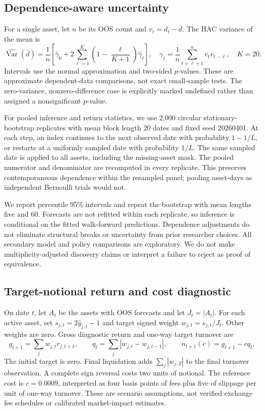 \documentclass[preprint,12pt,authoryear]{elsarticle}
\begin{document}
\subsection{Dependence-aware uncertainty}
For a single asset, let $n$ be its OOS count and $v_t=d_t-\bar d$. The HAC variance of the mean is
\begin{equation}
 \widehat{\operatorname{Var}}(\bar d)=\frac1n\left[
 \widehat\gamma_0+2\sum_{\ell=1}^{K}\left(1-\frac{\ell}{K+1}\right)\widehat\gamma_\ell\right],
 \quad \widehat\gamma_\ell=\frac1n\sum_{t=\ell+1}^{n}v_tv_{t-\ell},\quad K=20.
\end{equation}
Intervals use the normal approximation and two-sided $p$-values. These are approximate dependent-data comparisons, not exact small-sample tests. The zero-variance, nonzero-difference case is explicitly marked undefined rather than assigned a nonsignificant $p$-value.

For pooled inference and return statistics, we use 2,000 circular stationary-bootstrap replicates with mean block length 20 dates and fixed seed 20260401. At each step, an index continues to the next observed date with probability $1-1/L$, or restarts at a uniformly sampled date with probability $1/L$. The same sampled date is applied to all assets, including the missing-asset mask. The pooled numerator and denominator are recomputed in every replicate. This preserves contemporaneous dependence within the resampled panel; pooling asset-days as independent Bernoulli trials would not.

We report percentile 95\% intervals and repeat the bootstrap with mean lengths five and 60. Forecasts are not refitted within each replicate, so inference is conditional on the fitted walk-forward predictions. Dependence adjustments do not eliminate structural breaks or uncertainty from prior researcher choices. All secondary model and policy comparisons are exploratory. We do not make multiplicity-adjusted discovery claims or interpret a failure to reject as proof of equivalence.

\subsection{Target-notional return and cost diagnostic}
On date $t$, let $A_t$ be the assets with OOS forecasts and let $J_t=|A_t|$. For each active asset, set $s_{j,t}=2\widehat y_{j,t}-1$ and target signed weight $w_{j,t}=s_{j,t}/J_t$. Other weights are zero. Gross diagnostic return and one-way target turnover are
\begin{equation}
 g_{t+1}=\sum_j w_{j,t}r_{j,t+1},\qquad
 q_t=\sum_j|w_{j,t}-w_{j,t-1}|,\qquad
 n_{t+1}(c)=g_{t+1}-c q_t.
\end{equation}
The initial target is zero. Final liquidation adds $\sum_j|w_{j,T}|$ to the final turnover observation. A complete sign reversal costs two units of notional. The reference cost is $c=0.0009$, interpreted as four basis points of fees plus five of slippage per unit of one-way turnover. These are scenario assumptions, not verified exchange fee schedules or calibrated market-impact estimates.
\end{document}
